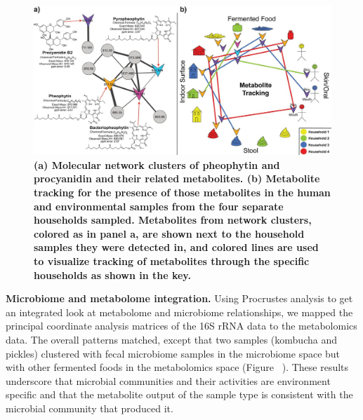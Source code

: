 \begin{figure}[htbp]
\includegraphics[width=\columnwidth]{chapter_48_hours_figures/F4.jpg}
\caption[(a) Molecular network clusters of pheophytin and procyanidin and their related metabolites. (b) Metabolite tracking for the presence of those metabolites in the human and environmental samples from the four separate households sampled. Metabolites from network clusters, colored as in panel a, are shown next to the household samples they were detected in, and colored lines are used to visualize tracking of metabolites through the specific households as shown in the key]{\textbf{(a) Molecular network clusters of pheophytin and procyanidin and their related metabolites. (b) Metabolite tracking for the presence of those metabolites in the human and environmental samples from the four separate households sampled. Metabolites from network clusters, colored as in panel a, are shown next to the household samples they were detected in, and colored lines are used to visualize tracking of metabolites through the specific households as shown in the key.}}
\label{rrfigure4}
\end{figure}

\textbf{Microbiome and metabolome integration.} Using Procrustes analysis \cite{Vazquez-Baeza2013}
to get an integrated look at metabolome and microbiome relationships, we mapped the
principal coordinate analysis matrices of the 16S rRNA data to the metabolomics
data. The overall patterns matched, except that two samples (kombucha and pickles)
clustered with fecal microbiome samples in the microbiome space but with other
fermented foods in the metabolomics space (Figure ~\cite{rrfigure5}). These
results underscore that microbial communities and their activities are environment
specific and that the metabolite output of the sample type is consistent with the
microbial community that produced it.


